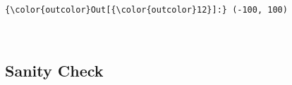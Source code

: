 \documentclass[11pt]{article}
\begin{document}
\begin{Verbatim}[commandchars=\\\{\}]
{\color{outcolor}Out[{\color{outcolor}12}]:} (-100, 100)
\end{Verbatim}
            
    \begin{center}
    \end{center}
    { \hspace*{\fill} \\}
    
    \hypertarget{sanity-check}{%
\subsection{Sanity Check}\label{sanity-check}}
\end{document}
